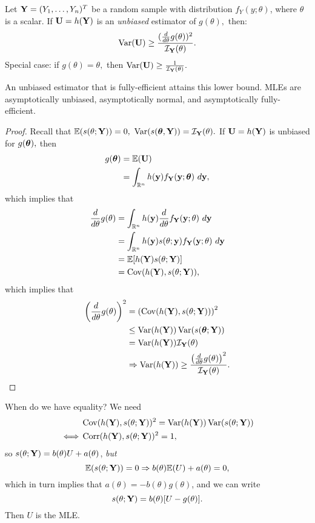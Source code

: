 \begin{theorem}
Let $\mathbf Y=(Y_1,\ldots,Y_n)^T$ be a random sample with distribution $f_Y(y;\theta)$, where $\theta$ is a scalar. If $\mathbf U=h(\mathbf Y)$ is an \textit{unbiased} estimator of $g(\theta),$ then:
$$
\operatorname*{Var}(\mathbf U)\geq \frac{(\frac{d}{d\theta}g(\theta))^2}{\mathcal I_\mathbf Y(\theta)}.
$$
Special case: if $g(\theta)=\theta,$ then $\operatorname*{Var}(\mathbf U)\geq \frac{1}{\mathcal I_\mathbf Y(\theta)}.$
\end{theorem}
An unbiased estimator that is fully-efficient attains this lower bound. MLEs are asymptotically unbiased, asymptotically normal, and asymptotically fully-efficient.
\begin{proof}
Recall that $\mathbb E(s(\theta;\mathbf Y))=0,$ $\operatorname*{Var}(s({\boldsymbol{\theta}},\mathbf Y))=\mathcal I_\mathbf Y(\theta).$ If $\mathbf U=h(\mathbf Y)$ is unbiased for $g({\boldsymbol{\theta}}),$ then 
\begin{align*}
    g({\boldsymbol{\theta}})&=\mathbb E(\mathbf U) \\
    &=\int_{\mathbb R^n}h(\mathbf y)f_\mathbf Y(\mathbf y;{\boldsymbol{\theta}}) \ d\mathbf y,
\end{align*}
which implies that
\begin{align*}
    \der{\theta}g(\theta)&=\int_{\RR^n}h(\yy)\der{\theta}f_\YY(\yy;\theta)\ d\yy \\
    &=\int_{\RR^n}h(\yy)s(\theta;\yy)f_\YY(\yy;\theta) \ d\yy \\
    &=\EE[h(\YY)s(\theta;\YY)] \\
    &=\Cov(h(\YY),s(\theta;\YY)), 
\end{align*}
which implies that
\begin{align*}
    \left(\frac{d}{d\theta}g(\theta)\right)^2&=\left(\operatorname*{Cov}(h(\mathbf Y),s(\theta;\mathbf Y))\right)^2 \\
    &\leq \operatorname*{Var}(h(\mathbf Y))\operatorname*{Var}(s({\boldsymbol{\theta}};\mathbf Y)) \\
    &=\operatorname*{Var}(h(\mathbf Y))\mathcal I_\mathbf Y(\theta) \\
    &\Rightarrow \operatorname*{Var}(h(\mathbf Y))\geq \frac{\left(\frac{d}{d\theta}g(\theta)\right)^2}{\mathcal I_\mathbf Y(\theta)}.
\end{align*}
\end{proof}
When do we have equality? We need 
\begin{align*}
&\operatorname*{Cov}(h(\mathbf Y),s(\theta;\mathbf Y))^2=\operatorname*{Var}(h(\mathbf Y))\operatorname*{Var}(s(\theta;\mathbf Y))\\
\;\Longleftrightarrow\; 
&\operatorname*{Corr}(h(\mathbf Y),s(\theta;\mathbf Y))^2=1,
\end{align*}
so $s(\theta;\mathbf Y)=b(\theta)U+a(\theta)$, \textit{but}
$$
\mathbb E(s(\theta;\mathbf Y))=0\Rightarrow b(\theta)\mathbb E(U)+a(\theta)=0,
$$
which in turn implies that $a(\theta)=-b(\theta)g(\theta)$, and we can write
$$
s(\theta;\mathbf Y)=b(\theta)[U-g(\theta)].
$$
Then $U$ is the MLE.

